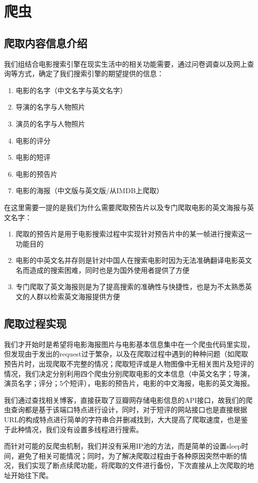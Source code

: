 \documentclass[main.tex]{subfiles}
\begin{document}
\section{爬虫}
\subsection{爬取内容信息介绍}

我们组结合电影搜索引擎在现实生活中的相关功能需要，通过问卷调查以及网上查询等方式，确定了我们搜索引擎的期望提供的信息：
\begin{enumerate}
	\item 电影的名字（中文名字与英文名字）
	\item 导演的名字与人物照片
	\item 演员的名字与人物照片
	\item 电影的评分
	\item 电影的短评
	\item 电影的预告片
	\item 电影的海报（中文版与英文版/从IMDB上爬取）
\end{enumerate}
在这里需要一提的是我们为什么需要爬取预告片以及专门爬取电影的英文海报与英文名字：
\begin{enumerate}[1)]
	\item 爬取的预告片是用于电影搜索过程中实现针对预告片中的某一帧进行搜索这一功能目的
	\item 电影的中英文名并存则是针对中国人在搜索电影时因为无法准确翻译电影英文名而造成的搜索困难，同时也是为国外使用者提供了方便
	\item 专门爬取了英文海报则是为了提高搜索的准确性与快捷性，也是为不太熟悉英文的人群以检索英文海报提供方便
\end{enumerate}
\subsection{爬取过程实现}
我们才开始时是希望将电影海报图片与电影基本信息集中在一个爬虫代码里实现，但发现由于发出的request过于繁杂，以及在爬取过程中遇到的种种问题（如爬取预告片时，出现爬取不完整的情况；爬取短评或是人物图像中无相关图片及短评的情况，我们决定分别利用四个爬虫分别爬取电影的文本信息（中英文名字；导演，演员名字；评分；5个短评），电影的预告片，电影的中文海报，电影的英文海报。\par
我们通过查找相关博客，直接获取了豆瓣网存储电影信息的API接口，故我们的爬虫查询都是基于该端口特点进行设计，同时，对于短评的网站接口也是直接根据URL的构成特点进行简单的字符串合并删减找到，大大提高了爬取速度，也是鉴于此种情况，我们没有设置多线程进行搜索。\par
而针对可能的反爬虫机制，我们并没有采用IP池的方法，而是简单的设置sleep时间，避免了相关可能情况；同时，为了解决爬取过程由于各种原因突然中断的情况，我们实现了断点续爬功能，将爬取的文件进行备份，下次直接从上次爬取的地址开始往下爬。
\end{document}
